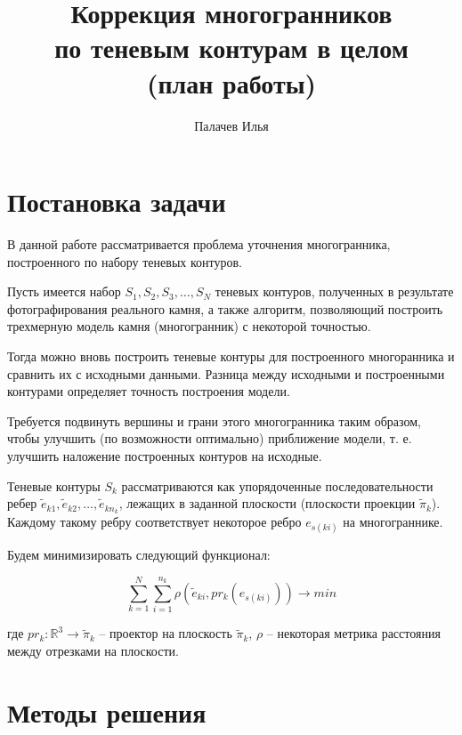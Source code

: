 \documentclass[a4paper,12pt, titlepage]{article}
\title{Коррекция многогранников \\ по теневым контурам в целом \\ (план работы)}
\author{Палачев Илья}
\begin{document}
\maketitle

\tableofcontents

\section{Постановка задачи}

\begin{flushleft}
В данной работе рассматривается проблема уточнения многогранника, построенного по 
набору теневых контуров.

Пусть имеется набор $S_{1}, S_{2}, S_{3}, \ldots, S_{N}$ теневых контуров,
полученных в результате фотографирования реального камня, а также алгоритм,
позволяющий построить трехмерную модель камня (многогранник) с некоторой 
точностью. 

Тогда можно вновь построить теневые контуры для построенного многоранника
и сравнить их с исходными данными. Разница между исходными и построенными контурами
определяет точность построения модели.

Требуется подвинуть вершины и грани этого многогранника таким образом, чтобы 
улучшить (по возможности оптимально) приближение модели, т. е. улучшить наложение 
построенных контуров на исходные.
\end{flushleft}

\begin{flushleft}
 Теневые контуры $S_{k}$ рассматриваются как упорядоченные последовательности ребер
$\tilde{e}_{k1}, \tilde{e}_{k2}, \ldots, \tilde{e}_{kn_{k}}$, 
лежащих в заданной плоскости (плоскости проекции $\tilde{\pi}_{k}$). 
Каждому такому ребру соответствует некоторое ребро $e_{s(ki)}$ на многограннике.

Будем минимизировать следующий функционал:

\begin{equation}
\sum\limits_{k = 1}^{N}\sum\limits_{i = 1}^{n_{k}} \rho (\tilde{e}_{ki} , pr_{k}(e_{s(ki)})) 
\to min
\end{equation}

где $pr_{k} : \mathbb{R}^{3} \to \tilde{\pi}_{k}$ -- проектор на плоскость 
$\tilde{\pi}_{k}$, $\rho$ -- некоторая метрика расстояния между отрезками на плоскости.
\end{flushleft}





\section{Методы решения}
\end{document}
